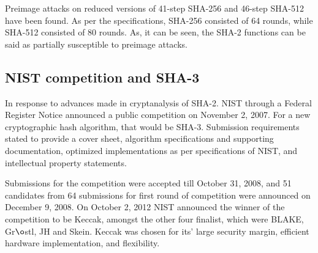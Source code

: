   Preimage attacks on reduced versions of 41-step SHA-256 and 46-step SHA-512 have been found. As per the
  specifications, SHA-256 consisted of 64 rounds, while SHA-512 consisted of 80 rounds.\cite{00011} As, it
  can be seen, the SHA-2 functions can be said as partially susceptible to preimage attacks.

  \subsection{NIST competition and SHA-3}

  In response to advances made in cryptanalysis of SHA-2. NIST through a Federal Register Notice announced 
  a public competition on November 2, 2007. For a new cryptographic hash algorithm, that would be SHA-3.
  Submission requirements stated to provide a cover sheet, algorithm specifications and supporting
  documentation, optimized implementations as per specifications of NIST, and intellectual property statements.

  Submissions for the competition were accepted till October 31, 2008, and 51 candidates from 64 submissions
  for first round of competition were announced on December 9, 2008. On October 2, 2012 NIST announced the 
  winner of the competition to be Keccak, amongst the other four finalist, which were BLAKE, Gr$\o$stl, JH
  and Skein. Keccak was chosen for its' large security margin, efficient hardware implementation, and 
  flexibility.
